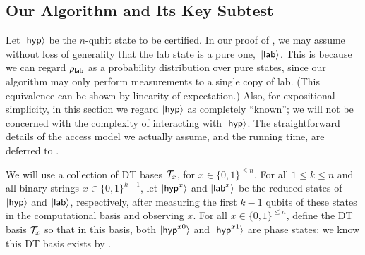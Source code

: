 
\subsection{Our Algorithm and Its Key Subtest}
\newcommand{\tarline}{\ket{\tar'}}
\newcommand{\labline}{\ket{\lab'}}
Let $\lvert\mathsf{hyp}\rangle$ be the $n$-qubit state to be certified. In our proof of , we may assume without loss of generality that the lab state is a pure one,~$\lvert\mathsf{lab}\rangle$. This is because we can regard $\rho_{\mathsf{lab}}$ as a probability distribution over pure states, since our algorithm may only perform measurements to a single copy of lab. (This equivalence can be shown by linearity of expectation.)
Also, for expositional simplicity, in this section we regard $\lvert\mathsf{hyp}\rangle$ as completely ``known''; we will not be concerned with the complexity of interacting with $\lvert\mathsf{hyp}\rangle$.  The straightforward details of the access model we actually assume, and the running time, are deferred to .

We will use a collection of DT bases $\mathcal{T}_x$, for $x\in \{0,1\}^{\leq n}$.
For all $1\leq k\leq n$ and all binary strings $x\in\{0,1\}^{k-1}$, let $\lvert\mathsf{hyp}^x\rangle$ and $\lvert\mathsf{lab}^x\rangle$ be the reduced states of $\lvert\mathsf{hyp}\rangle$ and $\lvert\mathsf{lab}\rangle$, respectively, after measuring the first $k-1$ qubits of these states in the computational basis and observing $x$. For all $x\in\{0,1\}^{\leq n}$, define the DT basis $\mathcal{T}_x$ so that in this basis, both $\lvert\mathsf{hyp}^{x0}\rangle$ and $\lvert\mathsf{hyp}^{x1}\rangle$ are phase states; we know this DT basis exists by .

